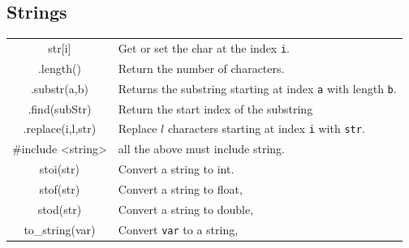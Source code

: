 \documentclass[5pt]{article}
\begin{document}
\begin{multicols}{2}
\subsection{Strings}
\begin{tabular}{C L}
str$[$i$]$          & Get or set the char at the index \texttt{i}.\\
.length()           & Return the number of characters.\\
.substr(a,b)        & Returns the substring starting at index \texttt{a} with length \texttt{b}.\\
.find(subStr)       & Return the start index of the substring\\
.replace(i,l,str)   & Replace $l$ characters starting at index \texttt{i} with \texttt{str}.\\
\#include <string>  & all the above must include string.\\
stoi(str)           & Convert a string to int.\\
stof(str)           & Convert a string to float,\\
stod(str)           & Convert a string to double,\\
to\_string(var)     & Convert \texttt{var} to a string,\\
\end{tabular}


\end{multicols}
\end{document}
